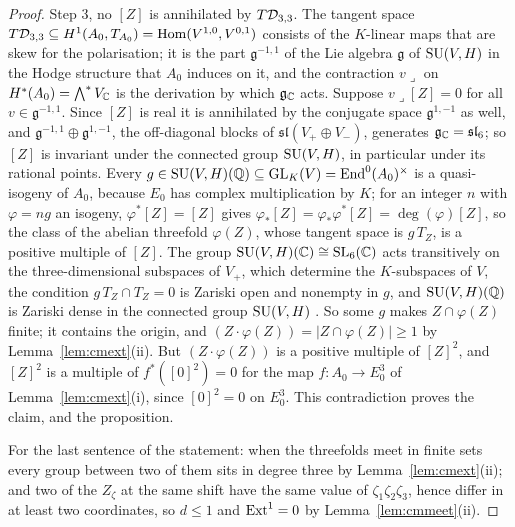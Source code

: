 \begin{proof}
Step 3, no $[Z]$ is annihilated by $T\mathcal{D}_{3,3}$. The tangent space $T\mathcal{D}_{3,3}\subseteq H^{1}(A_{0},T_{A_{0}})=\mathrm{Hom}(V^{1,0},V^{0,1})$ consists of the $K$-linear maps that are skew for the polarisation; it is the part $\mathfrak{g}^{-1,1}$ of the Lie algebra $\mathfrak{g}$ of $\mathrm{SU}(V,H)$ in the Hodge structure that $A_{0}$ induces on it, and the contraction $v\lrcorner$ on $H^{*}(A_{0})=\bigwedge^{*}V_{\mathbb{C}}$ is the derivation by which $\mathfrak{g}_{\mathbb{C}}$ acts. Suppose $v\lrcorner[Z]=0$ for all $v\in\mathfrak{g}^{-1,1}$. Since $[Z]$ is real it is annihilated by the conjugate space $\mathfrak{g}^{1,-1}$ as well, and $\mathfrak{g}^{-1,1}\oplus\mathfrak{g}^{1,-1}$, the off-diagonal blocks of $\mathfrak{sl}(V_{+}\oplus V_{-})$, generates $\mathfrak{g}_{\mathbb{C}}=\mathfrak{sl}_{6}$; so $[Z]$ is invariant under the connected group $\mathrm{SU}(V,H)$, in particular under its rational points. Every $g\in\mathrm{SU}(V,H)(\mathbb{Q})\subseteq\mathrm{GL}_{K}(V)=\mathrm{End}^{0}(A_{0})^{\times}$ is a quasi-isogeny of $A_{0}$, because $E_{0}$ has complex multiplication by $K$; for an integer $n$ with $\varphi=ng$ an isogeny, $\varphi^{*}[Z]=[Z]$ gives $\varphi_{*}[Z]=\varphi_{*}\varphi^{*}[Z]=\deg(\varphi)[Z]$, so the class of the abelian threefold $\varphi(Z)$, whose tangent space is $g\,T_{Z}$, is a positive multiple of $[Z]$. The group $\mathrm{SU}(V,H)(\mathbb{C})\cong\mathrm{SL}_{6}(\mathbb{C})$ acts transitively on the three-dimensional subspaces of $V_{+}$, which determine the $K$-subspaces of $V$, the condition $g\,T_{Z}\cap T_{Z}=0$ is Zariski open and nonempty in $g$, and $\mathrm{SU}(V,H)(\mathbb{Q})$ is Zariski dense in the connected group $\mathrm{SU}(V,H)$ \cite[Cor.~18.3]{Bor91}. So some $g$ makes $Z\cap\varphi(Z)$ finite; it contains the origin, and $(Z\cdot\varphi(Z))=|Z\cap\varphi(Z)|\ge1$ by Lemma~\ref{lem:cmext}(ii). But $(Z\cdot\varphi(Z))$ is a positive multiple of $[Z]^{2}$, and $[Z]^{2}$ is a multiple of $f^{*}([0]^{2})=0$ for the map $f\colon A_{0}\to E_{0}^{3}$ of Lemma~\ref{lem:cmext}(i), since $[0]^{2}=0$ on $E_{0}^{3}$. This contradiction proves the claim, and the proposition.

For the last sentence of the statement: when the threefolds meet in finite sets every group between two of them sits in degree three by Lemma~\ref{lem:cmext}(ii); and two of the $Z_{\zeta}$ at the same shift have the same value of $\zeta_{1}\zeta_{2}\zeta_{3}$, hence differ in at least two coordinates, so $d\le1$ and $\mathrm{Ext}^{1}=0$ by Lemma~\ref{lem:cmmeet}(ii).
\end{proof}

